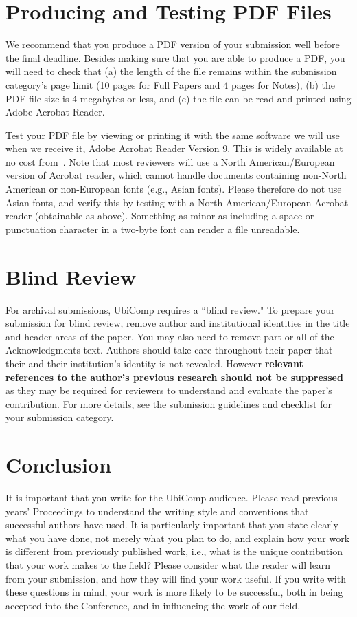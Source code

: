 \documentclass{ubicomp2013}
\begin{document}
\section{Producing and Testing PDF Files}
We recommend that you produce a PDF version of your submission well before the final deadline.  Besides making sure that you are able to produce a PDF, you will need to check that (a) the length of the file remains within the submission category's page limit (10 pages for Full Papers and 4 pages for Notes), (b) the PDF file size is 4 megabytes or less, and (c) the file can be read and printed using Adobe Acrobat Reader.

Test your PDF file by viewing or printing it with the same software we will use when we receive it, Adobe Acrobat Reader Version 9. This is widely available at no cost from~\cite{acrobat}.  Note that most reviewers will use a North American/European version of Acrobat reader, which cannot handle documents containing non-North American or non-European fonts (e.g., Asian fonts).  Please therefore do not use Asian fonts, and verify this by testing with a North American/European Acrobat reader (obtainable as above). Something as minor as including a space or punctuation character in a two-byte font can render a file unreadable.

\section{Blind Review}
For archival submissions, UbiComp requires a ``blind review." To prepare your submission for blind review, remove author and institutional identities in the title and header areas of the paper. You may also need to remove part or all of the Acknowledgments text.  Authors should take care throughout their paper that their and their institution's identity is not revealed. However \textbf{relevant references to the author's previous research should not be suppressed} as they may be required for reviewers to understand and evaluate the paper's contribution. For more details, see the submission guidelines and checklist for your submission category.

\section{Conclusion}
It is important that you write for the UbiComp audience.  Please read previous years' Proceedings to understand the writing style and conventions that successful authors have used.  It is particularly important that you state clearly what you have done, not merely what you plan to do, and explain how your work is different from previously published work, i.e., what is the unique contribution that your work makes to the field?  Please consider what the reader will learn from your submission, and how they will find your work useful.  If you write with these questions in mind, your work is more likely to be successful, both in being accepted into the Conference, and in influencing the work of our field.
\end{document}
